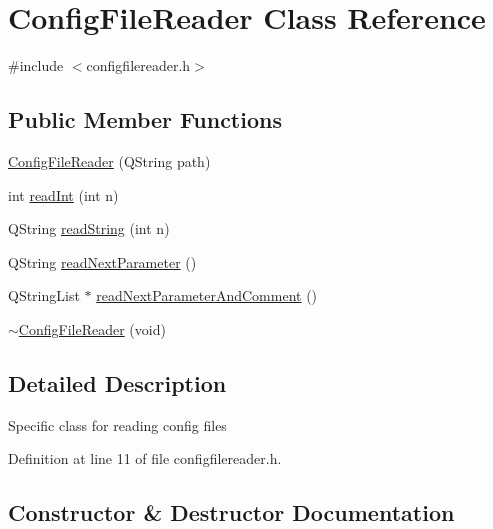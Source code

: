 \hypertarget{class_config_file_reader}{}\section{Config\+File\+Reader Class Reference}
\label{class_config_file_reader}


{\ttfamily \#include $<$configfilereader.\+h$>$}

\subsection*{Public Member Functions}
\begin{DoxyCompactItemize}
\item 
\mbox{\hyperlink{class_config_file_reader_a231983470627d026c0392e926d24dd14}{Config\+File\+Reader}} (Q\+String path)
\item 
int \mbox{\hyperlink{class_config_file_reader_aab64962cbf4949d24b8a1492855682c7}{read\+Int}} (int n)
\item 
Q\+String \mbox{\hyperlink{class_config_file_reader_a0cdc9e9df26b9ecbb3d7f57fa8c65fc8}{read\+String}} (int n)
\item 
Q\+String \mbox{\hyperlink{class_config_file_reader_a3dc4554eb1461c95007543e1a902dc9a}{read\+Next\+Parameter}} ()
\item 
Q\+String\+List $\ast$ \mbox{\hyperlink{class_config_file_reader_a5be7958f2247246009450ab0f1db5f52}{read\+Next\+Parameter\+And\+Comment}} ()
\item 
\mbox{\hyperlink{class_config_file_reader_a9cd16343d85a07ca48dd4bdf671036ee}{$\sim$\+Config\+File\+Reader}} (void)
\end{DoxyCompactItemize}


\subsection{Detailed Description}
Specific class for reading config files 

Definition at line 11 of file configfilereader.\+h.



\subsection{Constructor \& Destructor Documentation}
\mbox{\label{class_config_file_reader_a231983470627d026c0392e926d24dd14}} 
